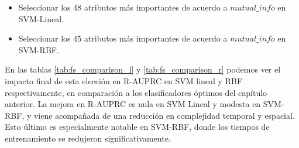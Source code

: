 \begin{itemize}
\item Seleccionar los 48 atributos más importantes de acuerdo a $mutual\_info$ en SVM-Lineal.
\item Seleccionar los 45 atributos más importantes de acuerdo a $mutual\_info$ en SVM-RBF.
\end{itemize}

En las tablas \ref{tab:fs_comparison_l} y \ref{tab:fs_comparison_r} podemos ver el impacto final de esta elección en R-AUPRC en SVM lineal y RBF respectivamente, en comparación a los clasificadores óptimos del capítulo anterior. La mejora en R-AUPRC es nula en SVM Lineal y modesta en SVM-RBF, y viene acompañada de una reducción en complejidad temporal y espacial. Esto último es especialmente notable en SVM-RBF, donde los tiempos de entrenamiento se redujeron significativamente.
 

